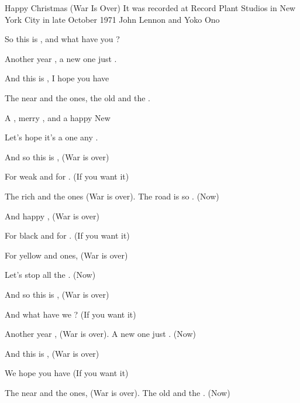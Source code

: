 \begin{SBSong}{Happy Christmas (War Is Over)}
    {It was recorded at Record Plant Studios in New York City in late October 1971}
    {John Lennon and Yoko Ono}
  \begin{SBVerse}
	So this is , and what have you ?
	
	Another year , a new one just .
	
	And  this is , I hope you have 
	
	The near and the  ones, the old and the .
  \end{SBVerse}
  \begin{SBChorus}
	A , merry , and a happy New 
	
	Let's hope it's a  one  any . 
  \end{SBChorus}
  \begin{SBVerse}
	And so this is , (War is over)
	
	For weak and for . (If you want it)
	
	The rich and the  ones (War is over). The road is so . (Now)
	
	And  happy , (War is over)
	
	For black and for . (If you want it)
	
	For yellow and  ones, (War is over)
	
	Let's stop all the . (Now)
  \end{SBVerse}
  \begin{SBVerse}
	And so this is , (War is over)
	
	And what have we ? (If you want it)
	
	Another year , (War is over). A new one just . (Now)
	
	And  this is , (War is over)
	
	We hope you have  (If you want it)
	
	The near and the  ones, (War is over). The old and the . (Now)
  \end{SBVerse}
\end{SBSong}
